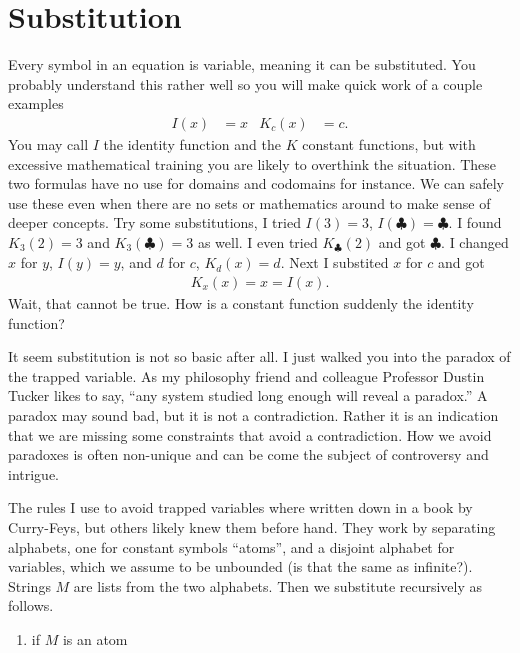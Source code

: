 \chapter{Substitution}

Every symbol in an equation is variable, meaning it can be substituted.
You probably understand this rather well so you will make quick work 
of a couple examples
\begin{align*}
    I(x) & = x & 
    K_c(x) & = c.
\end{align*}
You may call $I$ the identity function and the $K$ constant functions, 
but with excessive mathematical training you are likely to overthink 
the situation.  These two formulas have no use for domains and codomains for 
instance.  We can safely use these even when there are no sets or mathematics 
around to make sense of deeper concepts.
Try some substitutions, I tried $I(3)=3$, $I(\clubsuit)=\clubsuit$.
I found $K_3(2)=3$ and $K_3(\clubsuit)=3$ as well.  I even tried 
$K_{\clubsuit}(2)$ and got $\clubsuit$.  I changed $x$ for $y$, 
$I(y)=y$, and $d$ for $c$, $K_d(x)=d$. Next I substited $x$ for $c$ and got
\begin{align*}
    K_x(x)=x=I(x).
\end{align*}
Wait, that cannot be true.  How is a constant function suddenly the 
identity function?  

It seem substitution is not so basic after all.
I just walked you into the paradox of the trapped variable.
As my philosophy friend and colleague Professor Dustin Tucker likes to say, 
``any system studied long enough will reveal a paradox.'' 
A paradox may sound bad, but it is not a contradiction.  Rather 
it is an indication that we are missing some constraints that 
avoid a contradiction.  How we avoid paradoxes is often non-unique 
and can be come the subject of controversy and intrigue.

The rules I use to avoid trapped variables where written down in a book by
Curry-Feys, but others likely knew them before hand.  They work by separating 
alphabets, one for constant symbols ``atoms'', and a disjoint alphabet for 
variables, which we assume to be unbounded (is that the same as infinite?).
Strings $M$ are lists from the two alphabets.  Then we substitute recursively 
as follows.
\begin{figure}[!htbp]
\end{figure}
\begin{enumerate}
    \item if $M$ is an atom
\end{enumerate}


